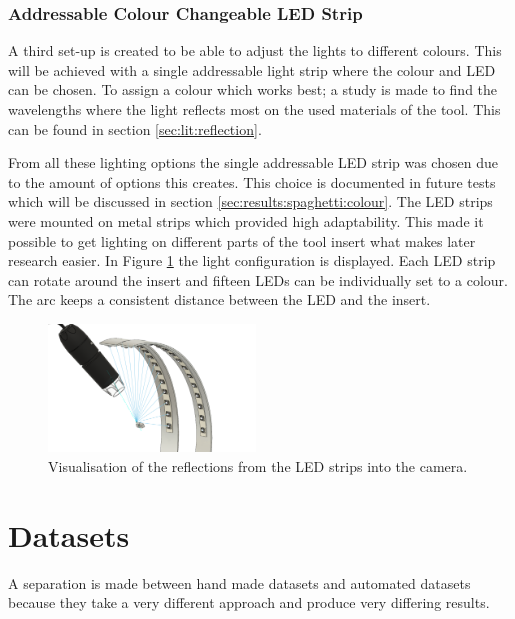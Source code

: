 	\subsubsection{Addressable Colour Changeable LED Strip}
	\label{sec:impl:camerasetup:light:ledstrips}

		A third set-up is created to be able to adjust the lights to different colours. This will be achieved with a single addressable light strip where the colour and LED can be chosen. 
		To assign a colour which works best; a study is made to find the wavelengths where the light reflects most on the used materials of the tool. This can be found in section \ref{sec:lit:reflection}.

From all these lighting options the single addressable LED strip was chosen due to the amount of options this creates. This choice is documented in future tests which will be discussed in section \ref{sec:results:spaghetti:colour}. The LED strips were mounted on metal strips which provided high adaptability. This made it possible to get lighting on different parts of the tool insert what makes later research easier. In Figure \ref{fig:impl:camerasetup:adressablestrips:reflection} the light configuration is displayed. Each LED strip can rotate around the insert and fifteen LEDs can be individually set to a colour. The arc keeps a consistent distance between the LED and the insert. 
	
	\begin{figure}[hbtp]
		\centering
		\includegraphics[width=0.49\textwidth]{fig/Camera_setup/adressable_ledstrip/ledstrips v13 close up with reflection.png}
		\caption{Visualisation of the reflections from the LED strips into the camera.}
		\label{fig:impl:camerasetup:adressablestrips:reflection}
	\end{figure}
	

\section{Datasets}
\label{sec:impl:dataset}
A separation is made between hand made datasets and automated datasets because they take a very different approach and produce very differing results.

